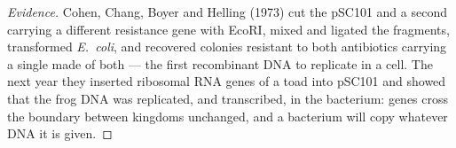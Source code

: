 \begin{proof}[Evidence]
Cohen, Chang, Boyer and Helling (1973) cut the  pSC101 and a
second  carrying a different resistance gene with EcoRI, mixed
and ligated the fragments, transformed \emph{E.~coli}, and recovered
colonies resistant to both antibiotics carrying a single  made of
both --- the first recombinant DNA to replicate in a cell. The next year
they inserted ribosomal RNA genes of a toad into pSC101 and showed that
the frog DNA was replicated, and transcribed, in the bacterium: genes
cross the boundary between kingdoms unchanged, and a bacterium will
copy whatever DNA it is given.
\end{proof}

